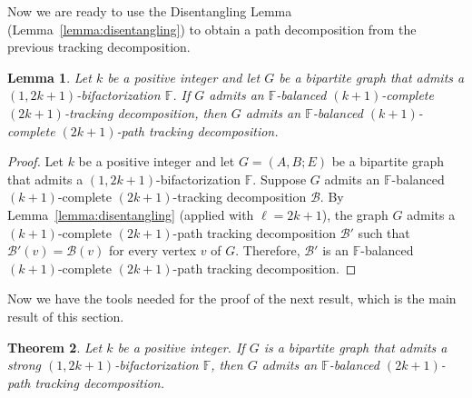 \documentclass[12pt,reqno,a4paper]{amsart}
\newtheorem{theorem}{Theorem}[section]
\newtheorem{lemma}[theorem]{Lemma}
\newcommand{\B}{\mathcal{B}}
\begin{document}
Now we are ready to use the Disentangling Lemma 
(Lemma~\ref{lemma:disentangling})
to obtain a path decomposition from the previous tracking decomposition.

\begin{lemma}\label{lemma:odd-path-dec}
	Let \(k\) be a positive integer and let \(G\) be a bipartite graph that 
admits a 
	\((1,2k+1)\)-bifactorization \(\mathbb{F}\).
	If \(G\) admits an \(\mathbb{F}\)-balanced \((k+1)\)-complete 
	$(2k+1)$-tracking decomposition, 
	then \(G\) admits an \(\mathbb{F}\)-balanced \((k+1)\)-complete 
	$(2k+1)$-path tracking decomposition.
\end{lemma}

\begin{proof}
	Let \(k\) be a positive integer and let \(G = (A,B;E)\) be a bipartite 
graph that admits a \((1,2k+1)\)-bifactorization \(\mathbb{F}\).
	Suppose \(G\) admits an \(\mathbb{F}\)-balanced 
\((k+1)\)-complete
	$(2k+1)$-tracking decomposition \(\B\).
	By Lemma~\ref{lemma:disentangling} (applied with \(\ell = 2k+1\)),
	the graph \(G\) admits a \((k+1)\)-complete \((2k+1)\)-path tracking decomposition \(\B'\)
	such that \(\B'(v) = \B(v)\) for every vertex \(v\) of \(G\). 
	Therefore, \(\B'\) is an \(\mathbb{F}\)-balanced 
	\((k+1)\)-complete $(2k+1)$-path tracking decomposition.
\end{proof}


Now we have the tools needed for the proof of the next result, which is the 
main result of this section.


\begin{theorem}\label{thm:odd-path-decomposition}
	Let \(k\) be a positive integer. If \(G\) is a bipartite graph that 
admits a strong  \((1,2k+1)\)-bifactorization \(\mathbb{F}\),
	then \(G\) admits an \(\mathbb{F}\)-balanced $(2k+1)$-path tracking decomposition.
\end{theorem}
\end{document}
